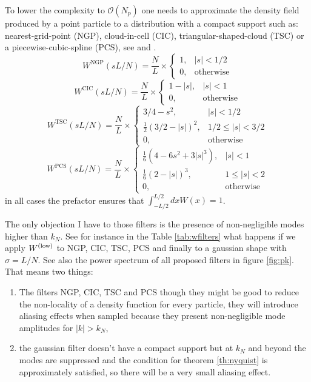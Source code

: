 To lower the complexity to $\mathcal{O}(N_p)$ one needs to approximate 
the density field produced by a point particle to a distribution with a compact support
such as: nearest-grid-point (NGP), cloud-in-cell (CIC), triangular-shaped-cloud (TSC)
or a piecewise-cubic-spline (PCS), see \cite{sefusatti} and \cite{hockney}.
\begin{equation}
    W^{\text{NGP}}(s L/N) = 
    \frac{N}{L} \times
    \begin{cases} 
        1, & |s|< 1/2 \\
        0, &\text{otherwise}
    \end{cases}
\end{equation}
\begin{equation}
    W^{\text{CIC}}(s L/N) = 
    \frac{N}{L} \times
    \begin{cases} 
        1-|s|, & |s|< 1 \\
        0, &\text{otherwise}
    \end{cases}
\end{equation}
\begin{equation}
    W^{\text{TSC}}(s L/N) = 
    \frac{N}{L} \times
    \begin{cases} 
        3/4 - s^2, & |s|< 1/2 \\
        \frac{1}{2}(3/2 - |s|)^2, & 1/2 \le |s|< 3/2 \\
        0, &\text{otherwise}
    \end{cases}
\end{equation}
\begin{equation}
    W^{\text{PCS}}(s L/N) = 
    \frac{N}{L} \times
    \begin{cases} 
        \frac{1}{6}(4-6s^2+3|s|^3), & |s|< 1 \\
        \frac{1}{6}(2-|s|)^3, & 1\le |s| <2 \\
        0, &\text{otherwise}
    \end{cases}
\end{equation}
in all cases the prefactor ensures that $\int_{-L/2}^{L/2} dx W(x)  =1$.

The only objection I have to those filters is the presence of non-negligible
modes higher than $k_N$. See for instance in
the Table \ref{tab:wfilters} what happens if we apply $W^\mathrm{(low)}$ to
NGP, CIC, TSC, PCS and finally to a gaussian shape with $\sigma = L/N$.
See also the power spectrum of all proposed filters in figure \ref{fig:pk}.
That means two things:
\begin{enumerate}
    \item The filters NGP, CIC, TSC and PCS though they might be good
    to reduce the non-locality of a density function for every particle,
    they will introduce aliasing effects when sampled because
    they present non-negligible mode amplitudes for $|k|>k_N$,
    \item the gaussian filter doesn't have a compact support
    but at $k_N$ and beyond the modes are suppressed and 
    the condition for theorem \ref{th:nyquist} is approximately satisfied,
    so there will be a very small aliasing effect.
\end{enumerate}

